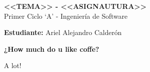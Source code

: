 \documentclass[answers]{exam} %
\begin{document}
\begin{center}
    \large\textbf{<<TEMA>> - <<ASIGNAUTURA>>}\\[1em]
    \large Primer Ciclo \enquote*{A} - Ingeniería de Software\\[1em]
\end{center}

\vspace{0.5cm}
\large\textbf{Estudiante:} Ariel Alejandro Calderón
\vspace{0.5cm}

\begin{questions}

    \question \large\textbf{¿How much do u like coffe?}
    \begin{solution}
        A lot!
    \end{solution}

    \vspace{0.5cm}

    
\end{questions}
\end{document}

